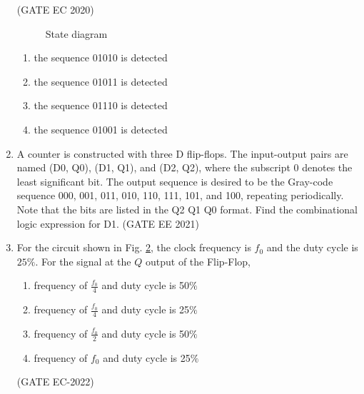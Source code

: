 \begin{enumerate}
\hfill (GATE EC 2020)
 \begin{figure}[h]
	 \centering
  
  \caption{State diagram}
  \label{fig:gate/ec/2020/39/1}		
  \end{figure}	 
\begin{enumerate}
 \item the sequence 01010 is detected
 \item the sequence 01011 is detected
 \item the sequence 01110 is detected
 \item the sequence 01001 is detected	 
\end{enumerate}	
	\item 		
		A counter is constructed with three D flip-flops. The input-output pairs are named (D0, Q0), (D1, Q1), and (D2, Q2), where the subscript 0 denotes the least significant bit. The output sequence is desired to be the Gray-code sequence 000, 001, 011, 010, 110, 111, 101, and 100, repeating periodically. Note that the bits are listed in the Q2 Q1 Q0 format. Find the combinational logic expression for D1.
\label{prob:2021-gate-ee-37}
\hfill (GATE EE 2021)

\item 
\label{prob:2022-gate-ec-43}
	 For the circuit shown in Fig. 
\ref{fig:2022-gate-ec-43},
		the clock frequency is $f_0$ and the duty cycle is $25 \%$. For the signal at the $Q$ output of the Flip-Flop,
\begin{enumerate}
	\item frequency of $\frac{f_0}{4}$ and duty cycle is 50$\%$
	\item frequency of $\frac{f_0}{4}$ and duty cycle is 25$\%$
	\item frequency of $\frac{f_0}{2}$ and duty cycle is 50$\%$
	\item frequency of $f_0$ and duty cycle is 25$\%$ \\
\end{enumerate}
\begin{figure}[h]
	\centering

	\caption{}
\label{fig:2022-gate-ec-43}
\end{figure}
\hfill 	(GATE EC-2022)


\end{enumerate}
